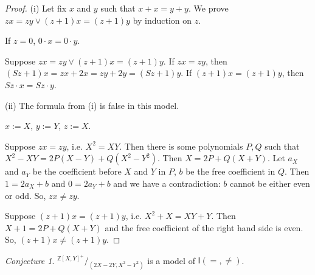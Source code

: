 \documentclass[a4paper,14pt]{article}
\theoremstyle{definition}
\theoremstyle{theorem}
\theoremstyle{lemma}
\theoremstyle{proposition}
\theoremstyle{remark}
\theoremstyle{corollary}
\theoremstyle{problem}
\theoremstyle{hypothesis}
\newtheorem{hypothesis}{Conjecture}
\begin{document}
\begin{proof}
    (i) Let fix $x$ and $y$ such that $x + x = y + y$. We prove $z x = z y \vee (z + 1) x = (z + 1) y$ by induction on $z$.
    
    If $z = 0$, $0 \cdot x = 0 \cdot y$.
    
    Suppose $z x = z y \vee (z + 1) x = (z + 1) y$. If $z x = z y$, then $(S z + 1) x = z x + 2 x = z y + 2 y = (S z + 1) y$. If $(z + 1) x = (z + 1) y$, then $S z \cdot x = S z \cdot y$.
    
    (ii) The formula from (i) is false in this model. 
    
    $x := X$, $y := Y$, $z := X$. 
    
    Suppose $z x = z y$, i.e. $X^2 = X Y$. Then there is some polynomials $P, Q$ such that $X^2 - X Y = 2P(X - Y) + Q(X^2 - Y^2)$. Then $X = 2 P + Q(X + Y)$. Let $a_X$ and $a_Y$ be the coefficient before $X$ and $Y$ in $P$, $b$ be the free coefficient in $Q$. Then $1 = 2 a_X + b$ and $0 = 2 a_Y + b$ and we have a contradiction: $b$ cannot be either even or odd. So, $z x \ne z y$.
    
    Suppose $(z + 1) x = (z + 1) y$, i.e. $X^2 + X = X Y + Y$. Then $X + 1 = 2 P + Q(X + Y)$ and the free coefficient of the right hand side is even. So, $(z + 1) x \ne (z + 1) y$.
\end{proof}

\begin{hypothesis}
    $^{\mathbb Z[X, Y]^+}\!/\!_{(2 X - 2 Y, X^2 - Y^2)}$ is a model of $\mathsf{I}(=, \ne)$.
\end{hypothesis}
\fi




\end{document}
